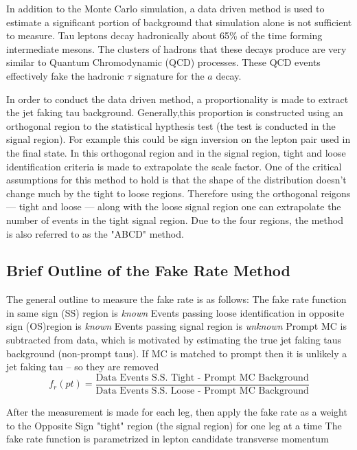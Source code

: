 In addition to the Monte Carlo simulation, a data driven method is used to estimate a significant portion of background that simulation alone is not sufficient to measure. Tau leptons decay hadronically about 65\% of the time forming intermediate mesons. The clusters of hadrons that these decays produce are very similar to Quantum Chromodynamic (QCD) processes. These QCD events effectively fake the hadronic $\tau$ signature for the $a$ decay. 

In order to conduct the data driven method, a proportionality is made to extract the jet faking tau background. Generally,this proportion is constructed using an orthogonal region to the statistical hypthesis test (the test is conducted in the signal region). For example this could be sign inversion on the lepton pair used in the final state. In this orthogonal region and in the signal region, tight and loose identification criteria is made to extrapolate the scale factor. One of the critical assumptions for this method to hold is that the shape of the distribution doesn't change much by the tight to loose regions. Therefore using the orthogonal reigons --- tight and loose --- along with the loose signal region one can extrapolate the number of events in the tight signal region. Due to the four regions, the method is also referred to as the "ABCD" method. 


\subsection{Brief Outline of the Fake Rate Method}
The general outline to measure the fake rate is as follows:
The fake rate function in same sign (SS) region is \textit{known}
Events passing loose identification in opposite sign (OS)region is \textit{known} 
Events passing signal region is \textit{unknown}
 Prompt MC is subtracted from data, which is motivated by estimating the true jet faking taus background (non-prompt taus). If MC is matched to prompt then it is unlikely a jet faking tau – so they are removed 
\[f_r(pt)=\frac{\text{Data Events S.S. Tight - Prompt MC Background}}{\text{Data Events S.S. Loose - Prompt MC Background}}\] 

After the measurement is made for each leg, then apply the fake rate as a weight to the Opposite Sign "tight" region (the signal region) for one leg at a time
The fake rate function is parametrized in lepton candidate transverse momentum

